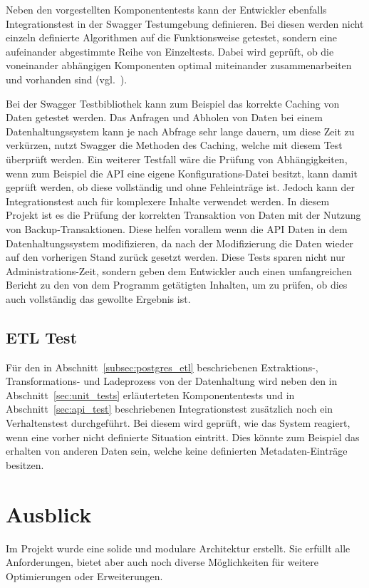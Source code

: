 Neben den vorgestellten Komponententests kann der Entwickler ebenfalls
Integrationstest in der Swagger Testumgebung definieren. Bei diesen werden
nicht einzeln definierte Algorithmen auf die Funktionsweise getestet, sondern
eine aufeinander abgestimmte Reihe von Einzeltests. Dabei wird geprüft, ob die
voneinander abhängigen Komponenten optimal miteinander zusammenarbeiten und
vorhanden sind (vgl.~\cite{Spring_Testing}).

Bei der Swagger Testbibliothek kann zum Beispiel das korrekte Caching von Daten
getestet werden. Das Anfragen und Abholen von Daten bei einem
Datenhaltungssystem kann je nach Abfrage sehr lange dauern, um diese Zeit zu
verkürzen, nutzt Swagger die Methoden des Caching, welche mit diesem Test
überprüft werden. Ein weiterer Testfall wäre die Prüfung von Abhängigkeiten,
wenn zum Beispiel die API eine eigene Konfigurations\hyp{}Datei besitzt, kann
damit geprüft werden, ob diese vollständig und ohne Fehleinträge ist. Jedoch
kann der Integrationstest auch für komplexere Inhalte verwendet werden. In
diesem Projekt ist es die Prüfung der korrekten Transaktion von Daten mit der
Nutzung von Backup\hyp{}Transaktionen. Diese helfen vorallem wenn die API Daten
in dem Datenhaltungssystem modifizieren, da nach der Modifizierung die Daten
wieder auf den vorherigen Stand zurück gesetzt werden. Diese Tests sparen nicht
nur Administrations\hyp{}Zeit, sondern geben dem Entwickler auch einen
umfangreichen Bericht zu den von dem Programm getätigten Inhalten, um zu
prüfen, ob dies auch vollständig das gewollte Ergebnis ist.
\nl%

\section{ETL Test}
\label{sec:etl_test}
Für den in Abschnitt~\ref{subsec:postgres_etl} beschriebenen Extraktions-,
Transformations- und Ladeprozess von der Datenhaltung wird neben den
in Abschnitt~\ref{sec:unit_tests} erläuterteten Komponententests und
in Abschnitt~\ref{sec:api_test} beschriebenen Integrationstest zusätzlich
noch ein Verhaltenstest durchgeführt. Bei diesem wird geprüft, wie das
System reagiert, wenn eine vorher nicht definierte Situation eintritt.
Dies könnte zum Beispiel das erhalten von anderen Daten sein, welche keine
definierten Metadaten\hyp{}Einträge besitzen.
\nl%

\chapter{Ausblick}
\label{chapter:ausblick}
Im Projekt wurde eine solide und modulare Architektur erstellt. Sie erfüllt
alle Anforderungen, bietet aber auch noch diverse Möglichkeiten für
weitere Optimierungen oder Erweiterungen.
\tm%

